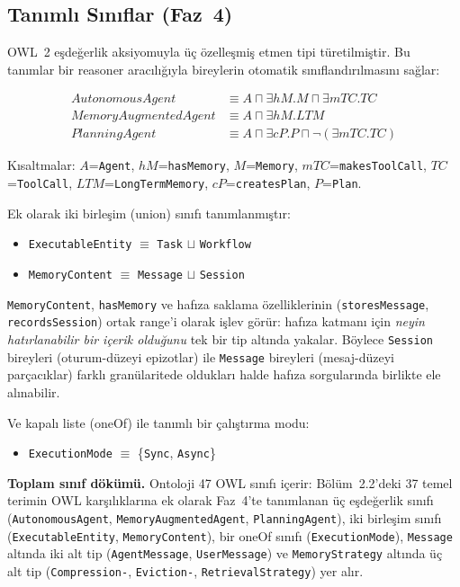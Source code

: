 \documentclass[10pt, a4paper, twocolumn]{article}
\begin{document}
\subsection{Tanımlı Sınıflar (Faz~4)}

OWL~2 eşdeğerlik aksiyomuyla üç özelleşmiş etmen tipi türetilmiştir. Bu tanımlar bir reasoner aracılığıyla bireylerin otomatik sınıflandırılmasını sağlar:

\begin{align*}
\textit{AutonomousAgent} &\equiv A \sqcap \exists hM.M \sqcap \exists mTC.TC \\
\textit{MemoryAugmentedAgent} &\equiv A \sqcap \exists hM.LTM \\
\textit{PlanningAgent} &\equiv A \sqcap \exists cP.P \sqcap \lnot(\exists mTC.TC)
\end{align*}

\noindent Kısaltmalar: $A$=\texttt{Agent}, $hM$=\texttt{hasMemory}, $M$=\texttt{Memory}, $mTC$=\texttt{makesToolCall}, $TC$=\texttt{ToolCall}, $LTM$=\texttt{LongTermMemory}, $cP$=\texttt{createsPlan}, $P$=\texttt{Plan}.

Ek olarak iki birleşim (union) sınıfı tanımlanmıştır:
\begin{itemize}
\item \texttt{ExecutableEntity} $\equiv$ \texttt{Task} $\sqcup$ \texttt{Workflow}
\item \texttt{MemoryContent} $\equiv$ \texttt{Message} $\sqcup$ \texttt{Session}
\end{itemize}

\noindent \texttt{MemoryContent}, \texttt{hasMemory} ve hafıza saklama özelliklerinin (\texttt{storesMessage}, \texttt{recordsSession}) ortak range'i olarak işlev görür: hafıza katmanı için \emph{neyin hatırlanabilir bir içerik olduğunu} tek bir tip altında yakalar. Böylece \texttt{Session} bireyleri (oturum-düzeyi epizotlar) ile \texttt{Message} bireyleri (mesaj-düzeyi parçacıklar) farklı granülaritede oldukları halde hafıza sorgularında birlikte ele alınabilir.

Ve kapalı liste (oneOf) ile tanımlı bir çalıştırma modu:
\begin{itemize}
\item \texttt{ExecutionMode} $\equiv$ \{\texttt{Sync}, \texttt{Async}\}
\end{itemize}

\noindent\textbf{Toplam sınıf dökümü.} Ontoloji 47 OWL sınıfı içerir: Bölüm~2.2'deki 37 temel terimin OWL karşılıklarına ek olarak Faz~4'te tanımlanan üç eşdeğerlik sınıfı (\texttt{AutonomousAgent}, \texttt{MemoryAugmentedAgent}, \texttt{PlanningAgent}), iki birleşim sınıfı (\texttt{ExecutableEntity}, \texttt{MemoryContent}), bir oneOf sınıfı (\texttt{ExecutionMode}), \texttt{Message} altında iki alt tip (\texttt{AgentMessage}, \texttt{UserMessage}) ve \texttt{MemoryStrategy} altında üç alt tip (\texttt{Compression-}, \texttt{Eviction-}, \texttt{RetrievalStrategy}) yer alır.
\end{document}
